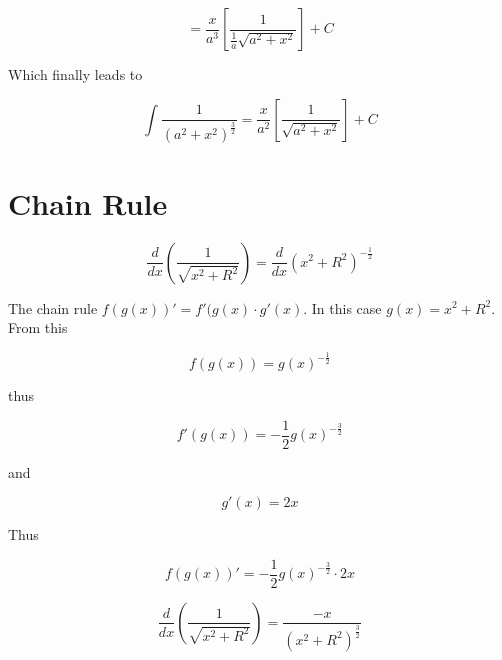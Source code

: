 \documentclass[14pt]{memoir}
\begin{document}
\begin{equation}
=  \frac{x}{a^3} [\frac{1}{\frac{1}{a} \sqrt{a^2+x^2}}] + C
\end{equation}

Which finally leads to

\begin{equation}
\int \frac{1}{(a^2 + x^2)^{\frac{3}{2}}} =  \frac{x}{a^2} [\frac{1}{\sqrt{a^2+x^2}}] + C
\end{equation}

\chapter{Chain Rule}

\begin{equation}
\frac{d}{dx} (\frac{1}{\sqrt{x^2+R^2}}) = \frac{d}{dx} (x^2+R^2)^{-\frac{1}{2}} 
\end{equation}

The chain rule $ f(g(x))' = f'(g(x) \cdot g'(x)$. In this case $g(x) = x^2 + R^2$. From this

\begin{equation}
f(g(x)) = g(x)^{-\frac{1}{2}} 
\end{equation}

thus  

\begin{equation}
f'(g(x)) = -\frac{1}{2} g(x)^{-\frac{3}{2}} 
\end{equation}

and

\begin{equation}
g'(x) = 2x
\end{equation}

Thus

\begin{equation}
f(g(x))' =  -\frac{1}{2} g(x)^{-\frac{3}{2}}  \cdot 2x
\end{equation}

\begin{equation}
\frac{d}{dx} (\frac{1}{\sqrt{x^2+R^2}}) = \frac{-x}{(x^2 + R^2)^\frac{3}{2}}
\end{equation}
\end{document}

